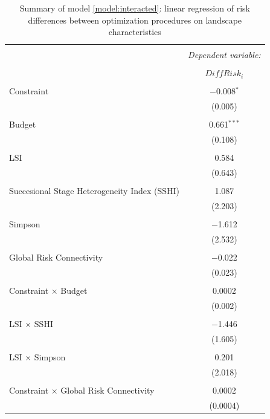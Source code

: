 \begin{table}[!htbp] \centering 
  \caption{Summary of model \ref{model:interacted}: linear regression of risk differences between optimization procedures on landscape characteristics } 
  \label{} 
\begin{tabular}{@{\extracolsep{5pt}}lc} 
\\[-1.8ex]\hline 
\hline \\[-1.8ex] 
 & \multicolumn{1}{c}{\textit{Dependent variable:}} \\ 
\cline{2-2} 
\\[-1.8ex] & $DiffRisk_i$ \\ 
\hline \\[-1.8ex] 
 Constraint & $-$0.008$^{*}$ \\ 
  & (0.005) \\ 
  & \\ 
 Budget & 0.661$^{***}$ \\ 
  & (0.108) \\ 
  & \\ 
 LSI & 0.584 \\ 
  & (0.643) \\ 
  & \\ 
 Succesional Stage Heterogeneity Index (SSHI) & 1.087 \\ 
  & (2.203) \\ 
  & \\ 
 Simpson & $-$1.612 \\ 
  & (2.532) \\ 
  & \\ 
 Global Risk Connectivity & $-$0.022 \\ 
  & (0.023) \\ 
  & \\ 
 Constraint $\times$ Budget & 0.0002 \\ 
  & (0.002) \\ 
  & \\ 
 LSI $\times$ SSHI & $-$1.446 \\ 
  & (1.605) \\ 
  & \\ 
 LSI $\times$ Simpson & 0.201 \\ 
  & (2.018) \\ 
  & \\ 
 Constraint $\times$ Global Risk Connectivity & 0.0002 \\ 
  & (0.0004) \\ 

\end{tabular}
\end{table}

